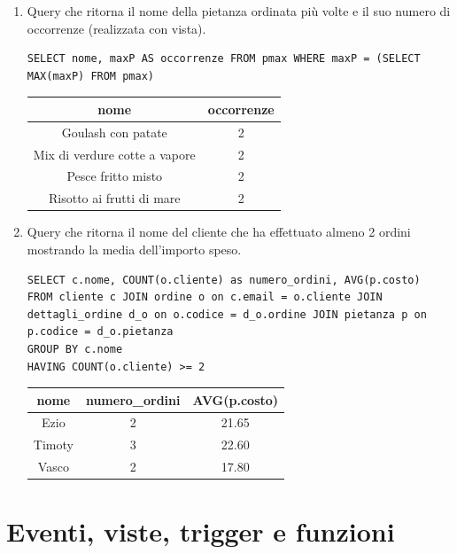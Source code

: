 \documentclass[10pt]{article}
\begin{document}
\begin{enumerate}[noitemsep]
\begin{table}[H]
\begin{tabular}{|c|}
		\end{tabular}
	\end{table}
	\item Query che ritorna il nome della pietanza ordinata più volte e il suo numero di occorrenze (realizzata con vista).
	\begin{lstlisting}[style=Mysql]
SELECT nome, maxP AS occorrenze FROM pmax WHERE maxP = (SELECT MAX(maxP) FROM pmax) \end{lstlisting}	
	\begin{table}[ht]
	\centering
		\label{table:query5}
		\begin{tabular}{|c|c|}
			\hline
			\multirow{1}{*}{\textbf{nome}} & \multicolumn{1}{c|}{\textbf{occorrenze}}\\
			\hline
			Goulash con patate & 2\\ \hline
			Mix di verdure cotte a vapore & 2\\ \hline
			Pesce fritto misto & 2\\ \hline
			Risotto ai frutti di mare & 2\\  \hline
			\end{tabular}
	\end{table}
		\item Query che ritorna il nome del cliente che ha effettuato almeno 2 ordini mostrando la media dell'importo speso.	\begin{lstlisting}[style=Mysql]
SELECT c.nome, COUNT(o.cliente) as numero_ordini, AVG(p.costo)
FROM cliente c JOIN ordine o on c.email = o.cliente JOIN dettagli_ordine d_o on o.codice = d_o.ordine JOIN pietanza p on p.codice = d_o.pietanza 
GROUP BY c.nome
HAVING COUNT(o.cliente) >= 2
\end{lstlisting}	
\begin{center}
	\begin{table}[ht]
	\centering
		\label{table:query4}
		\begin{tabular}{|c|c|c|}
			\hline
			\multirow{1}{*}{\textbf{nome}} & \multicolumn{1}{c|}{\textbf{numero\_ordini}} & \multicolumn{1}{c|}{\textbf{AVG(p.costo)}}\\
			\hline
			Ezio & 2 & 21.65\\ \hline
			Timoty & 3 & 22.60\\ \hline
			Vasco & 2 & 17.80\\ \hline
			\end{tabular}
	\end{table}
\end{center}
	\end{enumerate}
		\section{Eventi, viste, trigger e funzioni}
\end{document}

